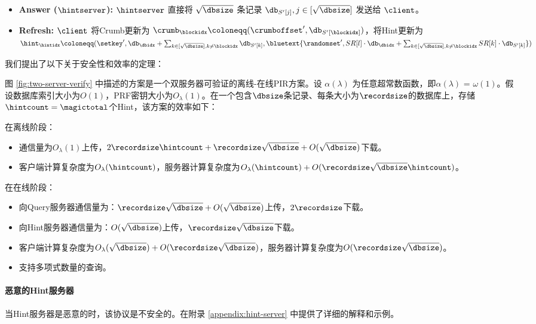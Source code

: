 \begin{mdframed}
\begin{itemize}
\begin{itemize}
                  \end{itemize}
            \item \textbf{Answer ($\hintserver$):} $\hintserver$ 直接将 $\sqrt{\dbsize}$ 条记录 $\db_{S'[j]}, j\in [\sqrt{\dbsize}]$ 发送给 $\client$。
            \item \textbf{Refresh:} $\client$ 将Crumb更新为 $\crumb_\blockidx \coloneqq  (\crumboffset', \db_{S'[\blockidx]})$，将Hint更新为 $\hint_\hintidx \coloneqq  (\setkey',\db_\dbidx + \sum_{k\in [\sqrt{\dbsize}],k\neq \blockidx}\db_{S'[k]}, \bluetext{\randomset', SR[l]\cdot \db_\dbidx + \sum_{k\in [\sqrt{\dbsize}],k\neq \blockidx}SR[k]\cdot \db_{S'[k]}})$
        \end{itemize}
    \end{mdframed}
    \label{fig:two-server-verify}

我们提出了以下关于安全性和效率的定理：

\begin{theorem}
    \label{thm:1}
    图 \ref{fig:two-server-verify} 中描述的方案是一个双服务器可验证的离线-在线PIR方案。设 $\alpha(\lambda)$ 为任意超常数函数，即$\alpha(\lambda)$ = $\omega(1)$。假设数据库索引大小为$O(1)$，PRF密钥大小为$O_\lambda(1)$。在一个包含$\dbsize$条记录、每条大小为$\recordsize$的数据库上，存储$\hintcount = \magictotal$个Hint，该方案的效率如下：
    
    \noindent 在离线阶段：
    \begin{itemize}[itemsep=0em]
        \item 通信量为$O_\lambda(1)$上传，$2\recordsize\hintcount + \recordsize\sqrt{\dbsize} + O(\sqrt{\dbsize})$下载。
        \item 客户端计算复杂度为$O_\lambda(\hintcount)$，服务器计算复杂度为$O_\lambda(\hintcount) + O(\recordsize\sqrt{\dbsize}\hintcount)$。
    \end{itemize}
    在在线阶段：
    \begin{itemize}[itemsep=0em]
        \item 向Query服务器通信量为：$\recordsize\sqrt{\dbsize} + O(\sqrt{\dbsize})$上传，$2\recordsize$下载。
        \item 向Hint服务器通信量为：$O(\sqrt{\dbsize})$上传，$\recordsize\sqrt{\dbsize}$下载。
        \item 客户端计算复杂度为$O_\lambda(\sqrt{\dbsize}) + O(\recordsize\sqrt{\dbsize})$，服务器计算复杂度为$O(\recordsize\sqrt{\dbsize})$。
        \item 支持多项式数量的查询。
    \end{itemize}
\end{theorem}

\paragraph{恶意的Hint服务器}
当Hint服务器是恶意的时，该协议是不安全的。在附录 \ref{appendix:hint-server} 中提供了详细的解释和示例。